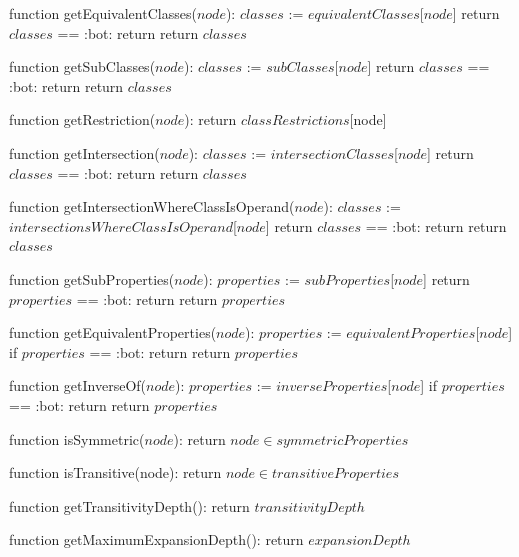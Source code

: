 function getEquivalentClasses($node$):
    $classes$ := $equivalentClasses$[$node$]
    return $classes$ == :bot:
        return {}
    return $classes$

function getSubClasses($node$):
    $classes$ := $subClasses$[$node$]
    return $classes$ == :bot:
        return {}
    return $classes$

function getRestriction($node$):
    return $classRestrictions$[node]

function getIntersection($node$):
    $classes$ := $intersectionClasses$[$node$]
    return $classes$ == :bot:
        return {}
    return $classes$

function getIntersectionWhereClassIsOperand($node$):
    $classes$ := $intersectionsWhereClassIsOperand$[$node$]
    return $classes$ == :bot:
        return {}
    return $classes$

function getSubProperties($node$): 
    $properties$ := $subProperties$[$node$]
    return $properties$ == :bot:
        return {}
    return $properties$

function getEquivalentProperties($node$):
    $properties$ := $equivalentProperties$[$node$]
    if $properties$ == :bot:
        return {}
    return $properties$

function getInverseOf($node$):
    $properties$ := $inverseProperties$[$node$]
    if $properties$ == :bot:
        return {}
    return $properties$
    
function isSymmetric($node$): 
    return $node \in symmetricProperties$

function isTransitive(node):
    return $node \in transitiveProperties$

function getTransitivityDepth():
    return $transitivityDepth$

function getMaximumExpansionDepth():
    return $expansionDepth$
